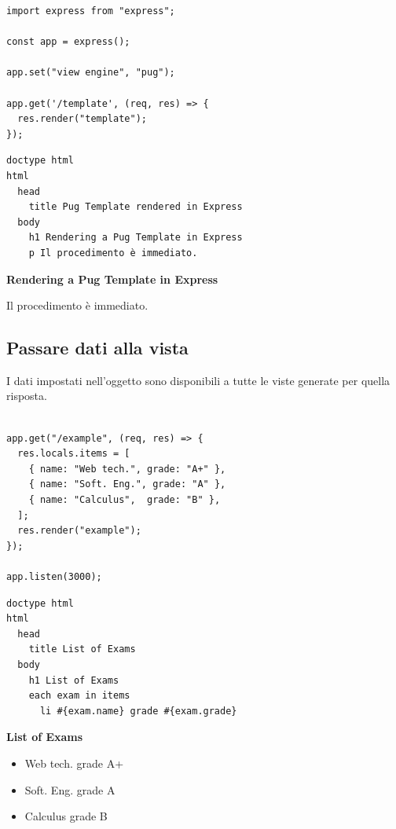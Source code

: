 \begin{lstlisting}[style=js, name=template.js]
import express from "express";

const app = express();

app.set("view engine", "pug");

app.get('/template', (req, res) => {
  res.render("template");
});
\end{lstlisting}

\begin{affianco}[0.55][c]
\begin{lstlisting}[style=pug, name=views/template.pug]
doctype html
html
  head
    title Pug Template rendered in Express
  body
    h1 Rendering a Pug Template in Express
    p Il procedimento è immediato.
\end{lstlisting}
\risultato
\begin{browser}
  {\raggedright\Lora\bfseries\LARGE Rendering a Pug Template in Express\par}\vspace{6pt}
  Il procedimento è immediato.
\end{browser}
\end{affianco}

\subsection{Passare dati alla vista}

I dati impostati nell'oggetto  sono disponibili a tutte le
viste generate per quella risposta.

\begin{lstlisting}[style=js, name=template.js, firstnumber=10]

app.get("/example", (req, res) => {
  res.locals.items = [
    { name: "Web tech.", grade: "A+" },
    { name: "Soft. Eng.", grade: "A" },
    { name: "Calculus",  grade: "B" },
  ];
  res.render("example");
});

app.listen(3000);
\end{lstlisting}

\begin{affianco}[0.5][c]
\begin{lstlisting}[style=pug, name=views/example.pug]
doctype html
html
  head
    title List of Exams
  body
    h1 List of Exams
    each exam in items
      li #{exam.name} grade #{exam.grade}
\end{lstlisting}
\risultato
\begin{browser}
  {\Lora\bfseries\LARGE List of Exams}
  \begin{itemize}[leftmargin=1.8em, itemsep=0pt, topsep=4pt, parsep=0pt]
    \item Web tech. grade A+
    \item Soft. Eng. grade A
    \item Calculus grade B
  \end{itemize}
\end{browser}
\end{affianco}

